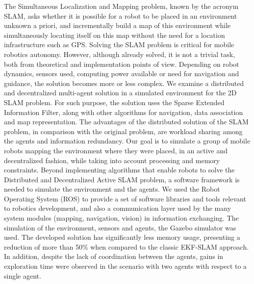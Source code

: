 The Simultaneous Localization and Mapping problem, known by the acronym SLAM, asks whether it is possible for a robot to be placed in an environment
unknown a priori, and incrementally build a map of this
environment while simultaneously locating itself on this map without the
need for a location infrastructure such as GPS.
Solving the SLAM problem is critical for mobile robotics
autonomy. However, although already solved, it is not a trivial task,
both from theoretical and implementation points of view.
Depending on robot dynamics, sensors used, computing power available or need for navigation and guidance, the solution
becomes more or less complex. We examine a distributed and decentralized multi-agent solution in a simulated environment
for the 2D SLAM problem. For such purpose, the solution uses the Sparse Extended Information Filter, along with other algorithms for navigation,
data association and map representation. The advantages of the distributed solution of the
SLAM problem, in comparison with the original problem, are workload sharing
among the agents and information redundancy. Our goal is to simulate a 
group of mobile robots mapping the environment where they were placed, 
in an active and decentralized fashion, while taking into account 
processing and memory constraints.
Beyond implementing algorithms that enable robots to solve the 
Distributed and Decentralized Active SLAM problem, a software framework is needed to simulate the environment and the agents. We used the Robot Operating System (ROS) to provide a set of software libraries and tools relevant to robotics 
development, and also a communication layer used by the many system 
modules (mapping, navigation, vision) in information exchanging. The 
simulation of the environment, sensors and agents, the Gazebo simulator 
was used.
The developed solution has significantly less memory usage,
presenting a reduction of more than 50\% when compared to the classic EKF-SLAM approach.
In addition, despite the lack of coordination between the agents,
gains in exploration time were observed in the scenario with two agents with respect to a single agent.

